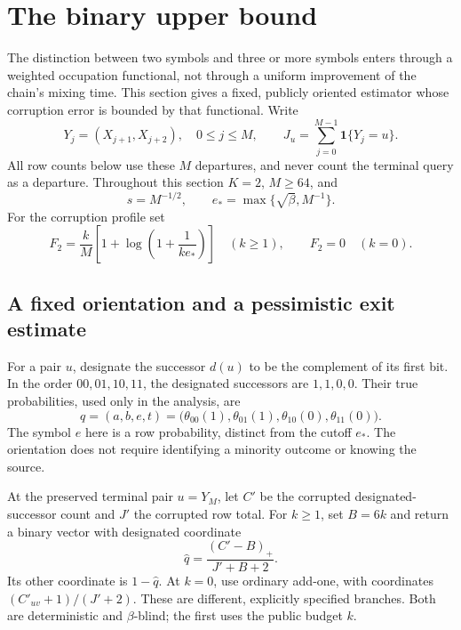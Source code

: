\section{The binary upper bound}
\label{bin:upper}
The distinction between two symbols and three or more symbols enters through a weighted occupation functional, not through a uniform improvement of the chain's mixing time. This section gives a fixed, publicly oriented estimator whose corruption error is bounded by that functional. Write
\[
 Y_j=(X_{j+1},X_{j+2}),\quad 0\le j\le M,
 \qquad J_u=\sum_{j=0}^{M-1}\mathbf 1\{Y_j=u\}.
\]
All row counts below use these $M$ departures, and never count the terminal query as a departure. Throughout this section $K=2$, $M\ge64$, and
\[
 s=M^{-1/2},\qquad e_*=\max\{\sqrt\beta,M^{-1}\}.
\]
For the corruption profile set
\[
 F_2=\frac{k}{M}\left[1+\log\left(1+\frac1{k e_*}\right)\right]
 \quad(k\ge1),\qquad F_2=0\quad(k=0).
\]

\subsection{A fixed orientation and a pessimistic exit estimate}
For a pair $u$, designate the successor $d(u)$ to be the complement of its first bit. In the order $00,01,10,11$, the designated successors are $1,1,0,0$. Their true probabilities, used only in the analysis, are
\[
 q=(a,b,e,t)=\bigl(\theta_{00}(1),\theta_{01}(1),
                    \theta_{10}(0),\theta_{11}(0)\bigr).
\]
The symbol $e$ here is a row probability, distinct from the cutoff $e_*$. The orientation does not require identifying a minority outcome or knowing the source.

At the preserved terminal pair $u=Y_M$, let $C'$ be the corrupted designated-successor count and $J'$ the corrupted row total. For $k\ge1$, set $B=6k$ and return a binary vector with designated coordinate
\begin{equation}
 \widehat q=\frac{(C'-B)_+}{J'+B+2}.
 \label{bin:estimator}
\end{equation}
Its other coordinate is $1-\widehat q$. At $k=0$, use ordinary add-one, with coordinates $(C'_{uv}+1)/(J'+2)$. These are different, explicitly specified branches. Both are deterministic and $\beta$-blind; the first uses the public budget $k$.

